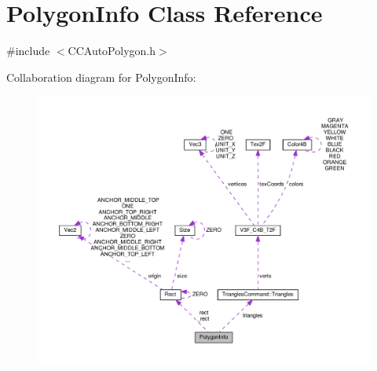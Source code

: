 \hypertarget{classPolygonInfo}{}\section{Polygon\+Info Class Reference}
\label{classPolygonInfo}


{\ttfamily \#include $<$C\+C\+Auto\+Polygon.\+h$>$}



Collaboration diagram for Polygon\+Info\+:
\nopagebreak
\begin{figure}[H]
\begin{center}
\leavevmode
\includegraphics[width=350pt]{classPolygonInfo__coll__graph}
\end{center}
\end{figure}

